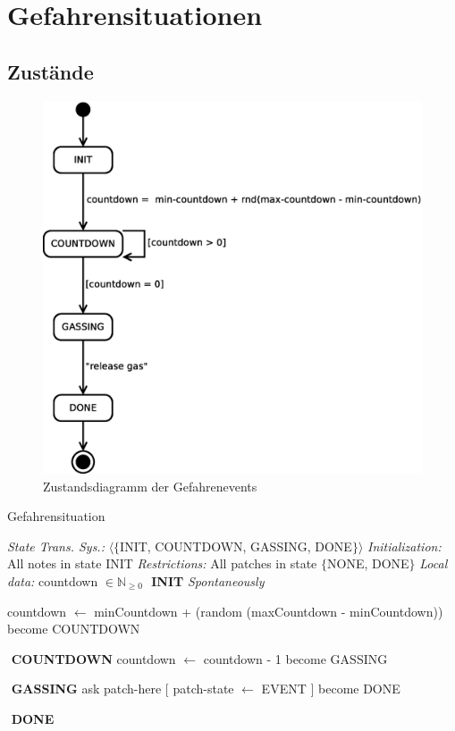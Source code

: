 \section{Gefahrensituationen}
\label{sec:gefahrensituationen}

\subsection{Zustände}


\begin{figure}
\centering
\includegraphics[height=0.6\textwidth]{simulationsumgebung/event.eps}
\caption{Zustandsdiagramm der Gefahrenevents}
\label{fig:event}
\end{figure}

\begin{algorithm}
\caption{Gefahrensituation}
\begin{algorithmic} 
\STATE \textit{State Trans. Sys.:} $\langle\{$INIT, COUNTDOWN, GASSING, DONE$\}\rangle$
\STATE \textit{Initialization:} All notes in state INIT
\STATE \textit{Restrictions:} All patches in state $\{$NONE, DONE$\}$
\STATE \textit{Local data:} countdown $\in \mathbb{N}_{\geq0}$ 
\STATE $ $
\STATE \textbf{INIT}
\STATE \textit{Spontaneously}

\STATE countdown $\leftarrow$ minCountdown + (random (maxCountdown - minCountdown))
\STATE become COUNTDOWN


\STATE $ $
\STATE \textbf{COUNTDOWN}
\STATE countdown $\leftarrow$ countdown - 1
\STATE become GASSING
\ENDIF

\STATE $ $
\STATE \textbf{GASSING}
\STATE ask patch-here $[$ patch-state $\leftarrow$ EVENT $]$ 
\STATE become DONE

\STATE $ $
\STATE \textbf{DONE}

\end{algorithmic}
\end{algorithm}


